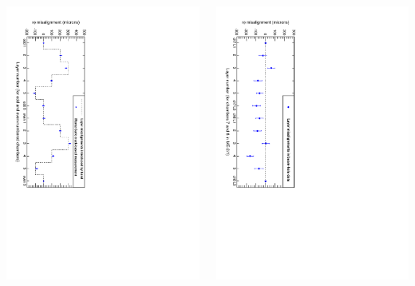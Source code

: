\documentclass[compress]{beamer}
\begin{document}
\begin{frame}
\begin{columns}
\vspace{0.2 cm}
\includegraphics[height=\linewidth, angle=90]{layer_test.pdf}

\vspace{0.2 cm}
\includegraphics[height=\linewidth, angle=90]{layer_data.pdf}
\end{columns}
\end{frame}
\end{document}
